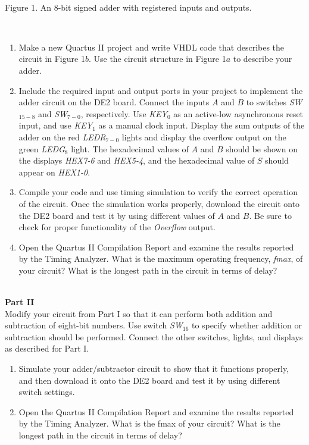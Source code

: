 \documentclass[psfig,10pt,fullpage]{article}
\begin{document}
\begin{figure}[H]
\scriptsize
\centerline{
\hbox{}}
\end{figure}
~\\
\centerline{Figure 1.  An 8-bit signed adder with registered inputs and outputs.}
~\\
\begin{enumerate}
\item Make a new Quartus II project and write VHDL code that describes the circuit in
Figure 1$b$. Use the circuit structure in Figure 1$a$ to describe your adder.
\item Include the required input and output ports in your project to implement the adder
circuit on the DE2 board. Connect the inputs $A$ and $B$ to switches {\it SW}$_{15-8}$ and 
{\it SW}$_{7-0}$, respectively. Use {\it KEY}$_0$ as an active-low asynchronous reset
input, and use {\it KEY}$_1$ as a manual clock input. Display the sum outputs of the adder
on the red {\it LEDR}$_{7-0}$ lights and display the overflow output on the green 
{\it LEDG}$_8$ light. The hexadecimal values of $A$ and $B$ should be shown on the 
displays {\it HEX7-6} and {\it HEX5-4}, and the hexadecimal value of $S$ should appear on
{\it HEX1-0}.
\item Compile your code and use timing simulation to verify the correct operation of
the circuit. Once the simulation works properly, download the circuit onto the DE2 board
and test it by using different values of $A$ and $B$. Be sure to check for proper
functionality of the {\it Overflow} output.
\item Open the Quartus II Compilation Report and examine the results reported by the
Timing Analyzer. What is the maximum operating frequency, {\it fmax}, of your circuit? What is
the longest path in the circuit in terms of delay?
\end{enumerate}

~\\
\noindent
{\bf Part II}
~\\

\noindent
Modify your circuit from Part I so that it can perform both addition and subtraction of
eight-bit numbers. Use switch {\it SW}$_{16}$ to specify whether addition or subtraction
should be performed. Connect the other switches, lights, and displays as described for
Part I.

\begin{enumerate}
\item Simulate your adder/subtractor circuit to show that it functions properly, and then
download it onto the DE2 board and test it by using different switch settings.
\item Open the Quartus II Compilation Report and examine the results reported by the
Timing Analyzer. What is the fmax of your circuit? What is
the longest path in the circuit in terms of delay?
\end{enumerate}
\end{document}
